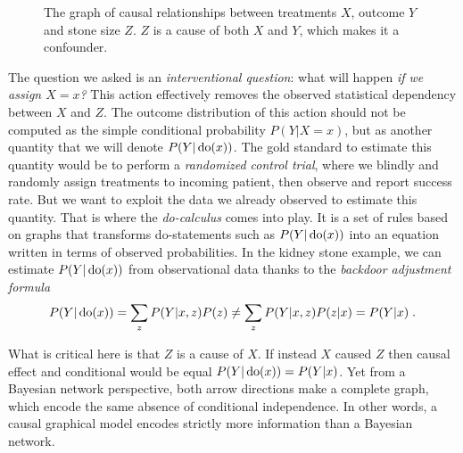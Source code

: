 \begin{figure}
    \centering
    \caption{The graph of causal relationships between treatments $X$, outcome $Y$ and stone size $Z$. $Z$ is a cause of both $X$ and $Y$, which makes it a confounder.}
    \label{fig:simpsons_paradox}
\end{figure}

The question we asked is an \textit{interventional question}: what will happen \textit{if we assign $X=x$?} This action effectively removes the observed statistical dependency between $X$ and $Z$. The outcome distribution of this action should not be computed as the simple conditional probability $P(Y|X=x)$, but as another quantity that we will denote $P(Y| \operatorname{\mathrm{do}}(x))$. The gold standard to estimate this quantity would be to perform a \textit{randomized control trial}, where we blindly and randomly assign treatments to incoming patient, then observe and report success rate. But we want to exploit the data we already observed to estimate this quantity. That is where the \textit{do-calculus} comes into play. It is a set of rules based on graphs that transforms do-statements such as $P(Y| \operatorname{\mathrm{do}}(x))$ into an equation written in terms of observed probabilities. 
In the kidney stone example, we can estimate $P(Y| \operatorname{\mathrm{do}}(x))$ from observational data thanks to the \textit{backdoor adjustment formula}
\begin{align}
    P(Y|\operatorname{\mathrm{do}}(x)) = \sum_z P(Y | x, z) P(z) 
    \neq \sum_z P(Y | x, z) P(z|x) = P(Y | x) \; .
    \label{eq:backdoor_adjustment}
\end{align}

What is critical here is that $Z$ is a cause of $X$. If instead $X$ caused $Z$ then causal effect and conditional would be equal $P(Y|\operatorname{\mathrm{do}}(x)) = P(Y | x)$. Yet from a Bayesian network perspective, both arrow directions make a complete graph, which encode the same absence of conditional independence. In other words, a causal graphical model encodes strictly more information than a Bayesian network.

